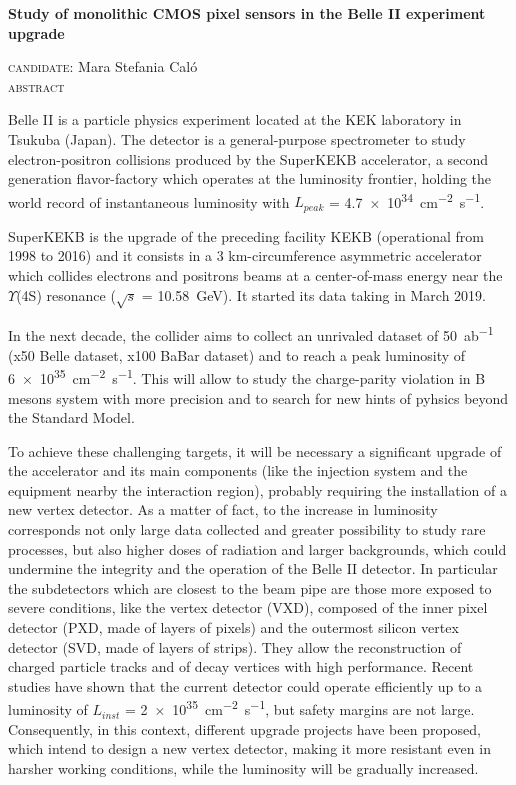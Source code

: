 \documentclass[10pt,a4paper]{report}
\begin{document}
\begin{center} \bfseries
\LARGE Study of monolithic CMOS pixel sensors in the Belle II experiment upgrade\\

\vspace{5mm}

\textsc{\large candidate:} \normalsize Mara Stefania Caló\\
\vspace{4mm}
\textsc{\large abstract}
\end{center}

Belle II is a particle physics experiment located at the KEK laboratory in Tsukuba (Japan). The detector is a general-purpose spectrometer to study electron-positron collisions produced by the SuperKEKB accelerator, a second generation flavor-factory which operates at the luminosity frontier, holding the world record of instantaneous luminosity with $L_{peak}$ = \SI{4.7e34}{cm^{-2}.s^{-1}}.

SuperKEKB is the upgrade of the preceding facility KEKB (operational from 1998 to 2016) and it consists in a 3 km-circumference asymmetric accelerator which collides electrons and positrons beams at a center-of-mass energy near the $\Upsilon$(4S) resonance ($\sqrt{s}$ = \SI{10.58}{GeV}). It started its data taking in March 2019.

In the next decade, the collider aims to collect  an unrivaled dataset of \SI{50}{ab^{-1}} (x50 Belle dataset, x100 BaBar dataset) and to reach a peak luminosity of \SI{6e35}{cm^{-2}.s^{-1}}. This will allow to study the charge-parity violation in B mesons system with more precision and to search for new hints of pyhsics beyond the Standard Model.

To achieve these challenging targets, it will be necessary a significant upgrade of the accelerator and its main components (like the injection system and the equipment nearby the interaction region), probably requiring the installation of a new vertex detector. As a matter of fact, to the increase in luminosity corresponds not only large data collected and greater possibility to study rare processes, but also higher doses of radiation and larger backgrounds, which could undermine the integrity and the operation of the Belle II detector.
In particular the subdetectors which are closest to the beam pipe are those more exposed to severe conditions, like the vertex detector (VXD), composed of the inner pixel detector (PXD, made of layers of pixels) and the outermost silicon vertex detector (SVD, made of layers of strips). They allow the reconstruction of charged particle tracks and of decay vertices with high performance. Recent studies have shown that the current detector could operate efficiently up to a luminosity of $L_{inst}$ = \SI{2e35}{cm^{-2}.s^{-1}}, but safety margins are not large. 
Consequently, in this context, different upgrade projects have been proposed, which intend to design a new vertex detector, making it more resistant even in harsher working conditions, while the luminosity will be gradually increased. 
\end{document}
